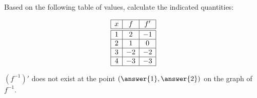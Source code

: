 \documentclass{ximera}
\author{Steven Gubkin}
\begin{document}
\begin{exercise}

Based on the following table of values, calculate the indicated quantities:

 \[
  \begin{array}{|c|c|c|}\hline
    x & f  & f' \\ \hline \hline
    1 & 2 & -1 \\ \hline
    2 & 1  & 0  \\ \hline
    3 & -2  & -2 \\ \hline
    4 & -3 & -3  \\ \hline
  \end{array}
  \]

$(f^{-1})'$ does not exist at the point $(\answer{1},\answer{2})$ on the graph of $f^{-1}$.

\end{exercise}
\end{document}
